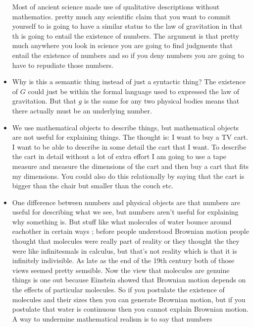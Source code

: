 \documentclass[12pt]{article}
\theoremstyle{definition}
\begin{document}
\begin{itemize}
        Most of ancient science made use of qualitative descriptions without
        mathematics. pretty much any scientific claim that you want to commit
        yourself to is going to have a similar status to the law of gravitation
        in that th is going to entail the existence of numbers. The argument is
        that pretty much anywhere you look in science you are going to find
        judgments that entail the existence of numbers and so if you deny
        numbers you are going to have to repudiate those numbers. 
    \item
        Why is this a semantic thing instead of just a syntactic thing? The
        existence of $G$ could just be within the formal language used to
        expressed the law of gravitation. But that $g$ is the same for any two
        physical bodies means that there actually must be an underlying number.
    \item
        We use mathematical objects to describe things, but mathematical
        objects are not useful for explaining things. The thought is: I want to
        buy a TV cart. I want to be able to describe in some detail the cart
        that I want. To describe the cart in detail without a lot of extra
        effort I am going to use a tape measure and measure the dimensions of
        the cart and then buy a cart that fits my dimensions. You could also do
        this relationally by saying that the cart is bigger than the chair but
        smaller than the couch etc. 
    \item
        One difference between numbers and physical objects are that numbers
        are useful for describing what we see, but numbers aren't useful for
        explaining why something is. But stuff like what molecules of water
        bounce around eachother in certain ways ; before people understood
        Brownian motion people thought that molecules were really part of
        reality or they thought the they were like infinitesmals in calculus,
        but that's not reality which is that it is infinitely indivisible. As
        late as the end of the 19th century both of those views seemed pretty
        semsible. Now the view that molecules are genuine things is one out
        because Einstein showed that Brownian motion depends on the effects of
        particular molecules. So if you postulate the existence of molecules
        and their sizes then you can generate Brownian motion, but if you
        postulate that water is continuous then you cannot explain Brownian
        motion. A way to undermine mathematical realism is to say that numbers

\end{itemize}
\end{document}
